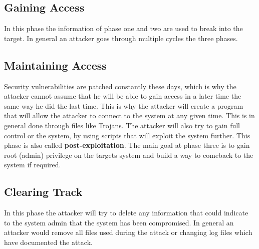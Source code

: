 \documentclass{article}%
\begin{document}
\subsection{Gaining Access}
In this phase the information of phase one and two are used to break into the target. In general an attacker goes through multiple cycles the three phases.
\subsection{Maintaining Access}
Security vulnerabilities are patched constantly these days, which is why the attacker cannot assume that he will be able to gain access in a later time the same way he did the last time. This is why the attacker will create a program that will allow the attacker to connect to the system at any given time. This is in general done through files like Trojans. The attacker will also try to gain full control or the system, by using scripts that will exploit the system further. This phase is also called \textbf{post-exploitation}. The main goal at phase three is to gain root (admin) privilege on the targets system and build a way to comeback to the system if required.
\subsection{Clearing Track}
In this phase the attacker will try to delete any information that could indicate to the system admin that the system has been compromised. In general an attacker would remove all files used during the attack or changing log files which have documented the attack.
\end{document}
